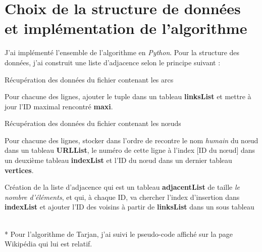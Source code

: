 \documentclass{article}
\begin{document}

\section{Choix de la structure de donn\'{e}es et impl\'{e}mentation de l'algorithme}

J'ai impl\'{e}ment\'{e} l'ensemble de l'algorithme en \textit{Python}. Pour la structure des donn\'{e}es, j'ai construit une liste d'adjacence selon le principe suivant :

\begin{enumerate}
\begin{item}
R\'{e}cup\'{e}ration des donn\'{e}es du fichier contenant les arcs
\end{item}
\begin{item}
Pour chacune des lignes, ajouter le tuple dans un tableau \textbf{linksList} et mettre \`{a} jour l'ID maximal rencontr\'{e} \textbf{maxi}.
\end{item}
\begin{item}
R\'{e}cup\'{e}ration des donn\'{e}es du fichier contenant les n\oe uds
\end{item}
\begin{item}
Pour chacune des lignes, stocker dans l'ordre de recontre le nom \textit{humain} du n\oe ud dans un tableau \textbf{URLList}, le numéro de cette ligne \`{a} l'index [ID du n\oe ud] dans un deuxi\`{e}me tableau \textbf{indexList} et l'ID du n\oe ud dans un dernier tableau \textbf{vertices}.
\end{item}
\begin{item}
Cr\'{e}ation de la liste d'adjacence qui est un tableau \textbf{adjacentList} de taille \textit{le nombre d'\'{e}l\'{e}ments}, et qui, \`{a} chaque ID, va chercher l'index d'insertion dans \textbf{indexList} et ajouter l'ID des voisins \`{a} partir de \textbf{linksList} dans un sous tableau
\end{item}
\end{enumerate}
~\\*
Pour l'algorithme de Tarjan, j'ai suivi le pseudo-code affich\'{e} sur la page Wikip\'{e}dia qui lui est relatif.

\end{document}
